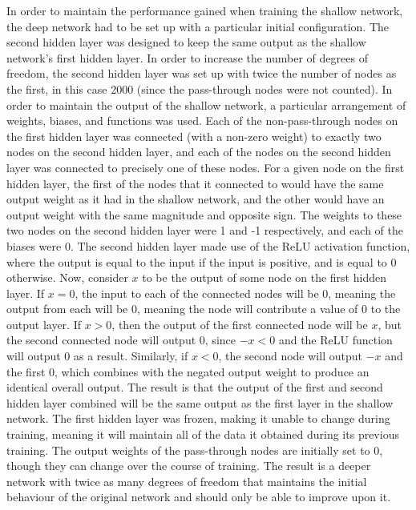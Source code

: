 \documentclass[12pt]{article}
\begin{document}
In order to maintain the performance gained when training the shallow network, the deep network had to be set up with a particular initial configuration. The second hidden layer was designed to keep the same output as the shallow network’s first hidden layer. In order to increase the number of degrees of freedom, the second hidden layer was set up with twice the number of nodes as the first, in this case 2000 (since the pass-through nodes were not counted). In order to maintain the output of the shallow network, a particular arrangement of weights, biases, and functions was used. Each of the non-pass-through nodes on the first hidden layer was connected (with a non-zero weight) to exactly two nodes on the second hidden layer, and each of the nodes on the second hidden layer was connected to precisely one of these nodes. For a given node on the first hidden layer, the first of the nodes that it connected to would have the same output weight as it had in the shallow network, and the other would have an output weight with the same magnitude and opposite sign. The weights to these two nodes on the second hidden layer were 1 and -1 respectively, and each of the biases were 0. The second hidden layer made use of the ReLU activation function, where the output is equal to the input if the input is positive, and is equal to 0 otherwise. Now, consider $x$ to be the output of some node on the first hidden layer. If $x=0$, the input to each of the connected nodes will be 0, meaning the output from each will be 0, meaning the node will contribute a value of 0 to the output layer. If $x>0$, then the output of the first connected node will be $x$, but the second connected node will output $0$, since $-x<0$ and the ReLU function will output $0$ as a result. Similarly, if $x<0$, the second node will output $-x$ and the first $0$, which combines with the negated output weight to produce an identical overall output. The result is that the output of the first and second hidden layer combined will be the same output as the first layer in the shallow network. The first hidden layer was frozen, making it unable to change during training, meaning it will maintain all of the data it obtained during its previous training. The output weights of the pass-through nodes are initially set to 0, though they can change over the course of training. The result is a deeper network with twice as many degrees of freedom that maintains the initial behaviour of the original network and should only be able to improve upon it.
\end{document}
